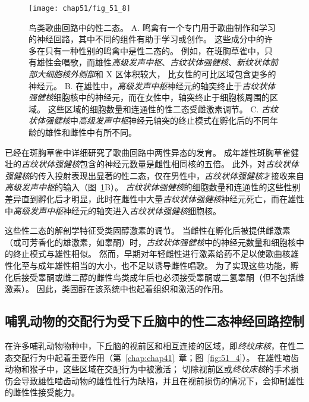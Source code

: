 \begin{figure}[htbp]
	\centering
	\texttt{[image: chap51/fig\_51\_8]}
	\caption{鸟类歌曲回路中的性二态。
		A. 鸣禽有一个专门用于歌曲制作和学习的神经回路，其中不同的组件有助于学习或创作。
		这些成分中的许多在只有一种性别的鸣禽中是性二态的。
		例如，在斑胸草雀中，只有雄性会唱歌，而雄性\textit{高级发声中枢}、\textit{古纹状体强健核}、\textit{新纹状体前部大细胞核外侧部}和 X 区体积较大， 比女性的可比区域包含更多的神经元\cite{brainard2002songbirds}。
		B. 在雄性中，\textit{高级发声中枢}神经元的轴突终止于\textit{古纹状体强健核}细胞核中的神经元，而在女性中，轴突终止于细胞核周围的区域。
		这些区域的细胞数量和连通性的性二态受雌激素调节\cite{morris2004sexual}。
		C. \textit{古纹状体强健核}中\textit{高级发声中枢}神经元轴突的终止模式在孵化后的不同年龄的雄性和雌性中有所不同\cite{konishi1985neuronal}。 }
	\label{fig:51_8}
\end{figure}


已经在斑胸草雀中详细研究了歌曲回路中两性异态的发育。
成年雄性斑胸草雀健壮的\textit{古纹状体强健核}包含的神经元数量是雌性相同核的五倍。
此外，对\textit{古纹状体强健核}的传入投射表现出显著的性二态，仅在男性中，\textit{古纹状体强健核}才接收来自\textit{高级发声中枢}的输入（图~\ref{fig:51_8}B）。
\textit{古纹状体强健核}的细胞数量和连通性的这些性别差异直到孵化后才明显，此时在雌性中大量\textit{古纹状体强健核}神经元死亡，而在雄性中\textit{高级发声中枢}神经元的轴突进入\textit{古纹状体强健核}细胞核。


这些性二态的解剖学特征受类固醇激素的调节。
当雌性在孵化后被提供雌激素（或可芳香化的雄激素，如睾酮）时，\textit{古纹状体强健核}中的神经元数量和细胞核中的终止模式与雄性相似。
然而，早期对年轻雌性进行激素给药不足以使歌曲核雄性化至与成年雄性相当的大小，也不足以诱导雌性唱歌。
为了实现这些功能，孵化后接受睾酮或雌二醇的雌性鸟类成年后也必须接受睾酮或二氢睾酮（但不包括雌激素）。
因此，类固醇在该系统中也起着组织和激活的作用。



\subsection{哺乳动物的交配行为受下丘脑中的性二态神经回路控制}

在许多哺乳动物物种中，下丘脑的视前区和相互连接的区域，即\textit{终纹床核}，在性二态交配行为中起着重要作用（第~\ref{chap:chap41}~章；图~\ref{fig:51_4}）。
在雄性啮齿动物和猴子中，这些区域在交配行为中被激活；
切除视前区或\textit{终纹床核}的手术损伤会导致雄性啮齿动物的雄性性行为缺陷，并且在视前损伤的情况下，会抑制雄性的雌性性接受能力。


